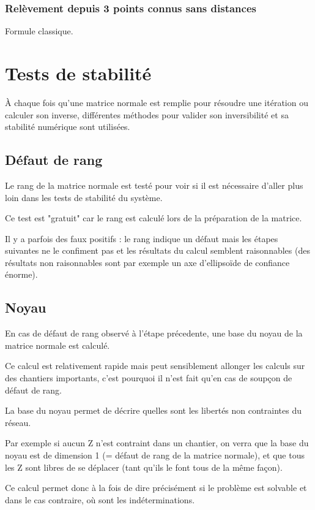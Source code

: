 \documentclass[french]{report}
\begin{document}
\subsection{Relèvement depuis 3 points connus sans distances}

Formule classique.

\chapter{Tests de stabilité}

À chaque fois qu'une matrice normale est remplie pour résoudre une itération ou calculer son inverse,
différentes méthodes pour valider son inversibilité et sa stabilité numérique sont utilisées.


\section{Défaut de rang}

Le rang de la matrice normale est testé pour voir si il est nécessaire d'aller plus loin dans
les tests de stabilité du système.

Ce test est "gratuit" car le rang est calculé lors de la préparation de la matrice.

Il y a parfois des faux positifs : le rang indique un défaut mais les étapes suivantes ne le confiment pas et les résultats du calcul semblent raisonnables
(des résultats non raisonnables sont par exemple un axe d'ellipsoïde de confiance énorme).


\section{Noyau}
En cas de défaut de rang observé à l'étape précedente, une base du noyau de la matrice normale est calculé.

Ce calcul est relativement rapide mais peut sensiblement allonger les calculs sur des chantiers importants, c'est pourquoi il n'est fait qu'en cas de soupçon de défaut de rang.

La base du noyau permet de décrire quelles sont les libertés non contraintes du réseau.

Par exemple si aucun Z n'est contraint dans un chantier, on verra que la base du noyau est de dimension 1 (= défaut de rang de la matrice normale),
et que tous les Z sont libres de se déplacer (tant qu'ils le font tous de la même façon).

Ce calcul permet donc à la fois de dire précisément si le problème est solvable et dans le cas contraire, où sont les indéterminations.
\end{document}
